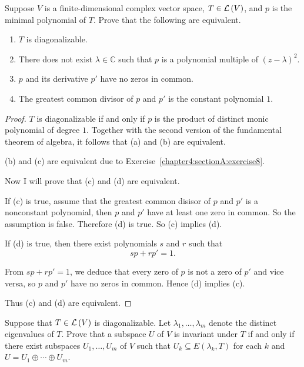 \begin{exercise}
    Suppose $V$ is a finite-dimensional complex vector space, $T\in\mathcal{L}\left({V}\right)$, and $p$ is the minimal polynomial of $T$. Prove that the following are equivalent.
    \begin{enumerate}[label={(\alph*)}]
        \item $T$ is diagonalizable.
        \item There does not exist $\lambda\in\mathbb{C}$ such that $p$ is a polynomial multiple of ${(z - \lambda)}^{2}$.
        \item $p$ and its derivative $p'$ have no zeros in common.
        \item The greatest common divisor of $p$ and $p'$ is the constant polynomial $1$.
    \end{enumerate}
\end{exercise}

\begin{proof}
    $T$ is diagonalizable if and only if $p$ is the product of distinct monic polynomial of degree $1$. Together with the second version of the fundamental theorem of algebra, it follows that (a) and (b) are equivalent.

    (b) and (c) are equivalent due to Exercise~\ref{chapter4:sectionA:exercise8}.

    Now I will prove that (c) and (d) are equivalent.

    If (c) is true, assume that the greatest common disisor of $p$ and $p'$ is a nonconstant polynomial, then $p$ and $p'$ have at least one zero in common. So the assumption is false. Therefore (d) is true. So (c) implies (d).

    If (d) is true, then there exist polynomials $s$ and $r$ such that
    \[
        sp + rp' = 1.
    \]

    From $sp + rp' = 1$, we deduce that every zero of $p$ is not a zero of $p'$ and vice versa, so $p$ and $p'$ have no zeros in common. Hence (d) implies (c).

    Thus (c) and (d) are equivalent.
\end{proof}
\newpage

\begin{exercise}
    Suppose that $T\in\mathcal{L}\left({V}\right)$ is diagonalizable. Let $\lambda_{1}, \ldots, \lambda_{m}$ denote the distinct eigenvalues of $T$. Prove that a subspace $U$ of $V$ is invariant under $T$ if and only if there exist subspaces $U_{1}, \ldots, U_{m}$ of $V$ such that $U_{k}\subseteq E(\lambda_{k}, T)$ for each $k$ and $U = U_{1}\oplus \cdots \oplus U_{m}$.
\end{exercise}

